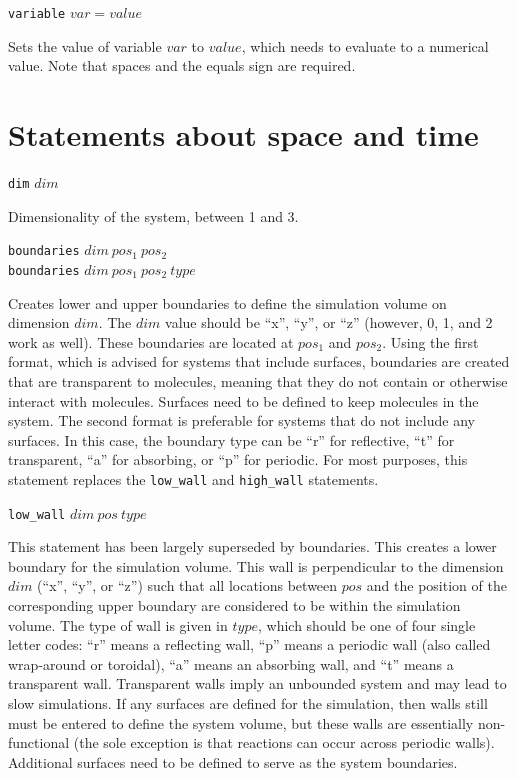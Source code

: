 \documentclass {scrbook}
\newcommand {\ttt} {\texttt}
\begin{document}
\begin{description}

\item{\ttt{variable} $var = value$}

Sets the value of variable $var$ to $value$, which needs to evaluate to a numerical value. Note that spaces and the equals sign are required.

\end{description}

\section{Statements about space and time}

\begin{description}

\item{\ttt{dim} $dim$}

Dimensionality of the system, between 1 and 3.

\item{\ttt{boundaries} $dim\ pos_1\ pos_2$\\
\ttt{boundaries} $dim\ pos_1\ pos_2\ type$}

Creates lower and upper boundaries to define the simulation volume on dimension $dim$. The $dim$ value should be ``x'', ``y'', or ``z'' (however, 0, 1, and 2 work as well). These boundaries are located at $pos_1$ and $pos_2$. Using the first format, which is advised for systems that include surfaces, boundaries are created that are transparent to molecules, meaning that they do not contain or otherwise interact with molecules. Surfaces need to be defined to keep molecules in the system. The second format is preferable for systems that do not include any surfaces. In this case, the boundary type can be ``r'' for reflective, ``t'' for transparent, ``a'' for absorbing, or ``p'' for periodic. For most purposes, this statement replaces the \ttt{low\_wall} and \ttt{high\_wall} statements.

\item{\ttt{low\_wall} $dim\ pos\ type$}

This statement has been largely superseded by boundaries. This creates a lower boundary for the simulation volume. This wall is perpendicular to the dimension $dim$ (``x'', ``y'', or ``z'') such that all locations between $pos$ and the position of the corresponding upper boundary are considered to be within the simulation volume. The type of wall is given in $type$, which should be one of four single letter codes: ``r'' means a reflecting wall, ``p'' means a periodic wall (also called wrap-around or toroidal), ``a'' means an absorbing wall, and ``t'' means a transparent wall. Transparent walls imply an unbounded system and may lead to slow simulations. If any surfaces are defined for the simulation, then walls still must be entered to define the system volume, but these walls are essentially non-functional (the sole exception is that reactions can occur across periodic walls). Additional surfaces need to be defined to serve as the system boundaries.


\end{description}
\end{document}
